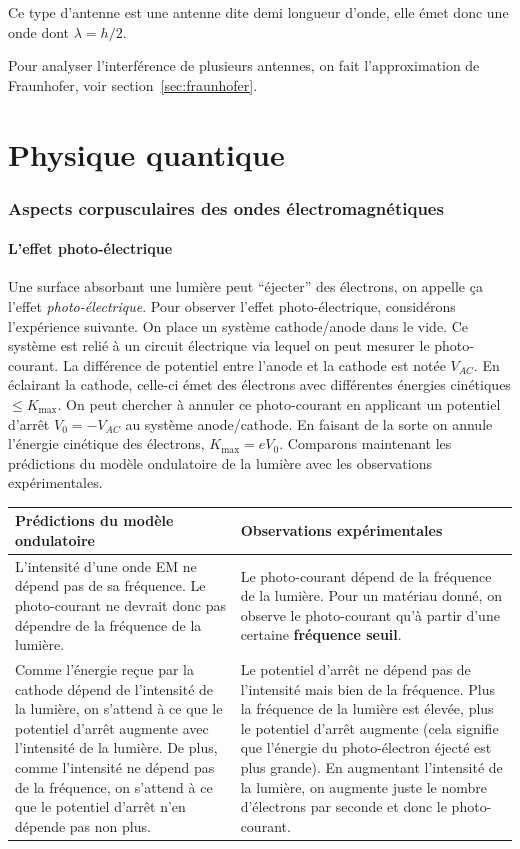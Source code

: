 Ce type d'antenne est une antenne dite demi longueur d'onde, elle émet
donc une onde dont $\lambda = h/2$.

Pour analyser l'interférence de plusieurs antennes,
on fait l'approximation de Fraunhofer, voir section~\ref{sec:fraunhofer}.



\part{Physique quantique}
\section{Aspects corpusculaires des ondes électromagnétiques}
\subsection{L'effet photo-électrique}
Une surface absorbant une lumière peut ``éjecter'' des électrons,
on appelle ça l'effet \emph{photo-électrique}.
Pour observer l'effet photo-électrique, considérons l'expérience
suivante. On place un système cathode/anode dans le vide. Ce système
est relié à un circuit électrique via lequel on peut mesurer le
photo-courant. La différence de potentiel entre l'anode et la
cathode est notée $V_{AC}$. En éclairant la cathode, celle-ci émet
des électrons avec différentes énergies cinétiques $\leq K_{\text{max}}$.
On peut chercher à annuler ce photo-courant en applicant un potentiel
d'arrêt $V_0 = -V_{AC}$ au système anode/cathode. En faisant de la sorte
on annule l'énergie cinétique des électrons, $K_{\text{max}} = eV_0$.
Comparons maintenant les prédictions du modèle ondulatoire de la lumière
avec les observations expérimentales.

\begin{tabular}{p{}|p{}}
	\textbf{Prédictions du modèle ondulatoire} & \textbf{Observations expérimentales} \\
	\hline
	L'intensité d'une onde EM ne dépend pas de sa fréquence. Le photo-courant
	ne devrait donc pas dépendre de la fréquence de la lumière.
	& Le photo-courant dépend de la fréquence de la lumière. Pour un
	matériau donné, on observe le photo-courant qu'à partir d'une
	certaine \textbf{fréquence seuil}. \\
	\hline
	Comme l'énergie reçue par la cathode dépend de l'intensité de la lumière,
	on s'attend à ce que le potentiel d'arrêt augmente avec l'intensité
	de la lumière. De plus, comme l'intensité ne dépend pas de la fréquence,
	on s'attend à ce que le potentiel d'arrêt n'en dépende pas non plus.
	& Le potentiel d'arrêt ne dépend pas de l'intensité mais bien de la
	fréquence. Plus la fréquence de la lumière est élevée, plus le potentiel
	d'arrêt augmente (cela signifie que l'énergie du photo-électron éjecté
	est plus grande). En augmentant l'intensité de la lumière, on augmente juste
	le nombre d'électrons par seconde et donc le photo-courant.
\end{tabular}

